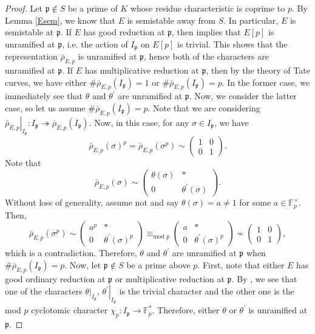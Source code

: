 \documentclass[]{article}
\begin{document}
\begin{proof}
 Let $\mathfrak{p}\notin S$ be a prime of $K$ whose residue characteristic is coprime to $p$. By Lemma \ref{Esem}, we know that $E$ is semistable away from $S$. In particular, $E$ is semistable at $\mathfrak{p}$. If $E$ has good reduction at  $\mathfrak{p}$, then \cite[Theorem VII.7.1]{silverman2009arithmetic} implies that $E[p]$ is unramified at $\mathfrak{p}$, i.e. the action of $I_{\mathfrak{p}}$ on $E[p]$ is trivial. This shows that the representation $\bar{\rho}_{E, p}$ is unramified at $\mathfrak{p}$, hence both of the characters are unramified at $\mathfrak{p}$. If $E$ has multiplicative reduction at $\mathfrak{p}$, then by the theory of Tate curves, we have either $\# \bar{\rho}_{E, p}(I_{\mathfrak{p}})=1$ or $\# \bar{\rho}_{E, p}(I_{\mathfrak{p}})=p$. In the former case, we immediately see that $\theta$ and $\theta^{\prime}$ are unramified at $\mathfrak{p}$. Now, we consider the latter case, so let us assume $\# \bar{\rho}_{E, p}(I_{\mathfrak{p}})=p$. Note that we are considering $\left.\bar{\rho}_{E, p}\right|_{I_{\mathfrak{p}}}: I_{\mathfrak{p}}\twoheadrightarrow \bar{\rho}_{E, p}(I_{\mathfrak{p}})$. Now, in this case, for any $\sigma\in I_{\mathfrak{p}}$, we have $$\bar{\rho}_{E, p}(\sigma)^p=\bar{\rho}_{E, p}(\sigma^p)\sim \left(\begin{array}{ll}
1 & 0 \\
0 & 1
\end{array}\right).$$Note that $$\bar{\rho}_{E, p}(\sigma)\sim \left(\begin{array}{ll}
\theta(\sigma) & * \\
0 & \theta^{\prime}(\sigma)
\end{array}\right).$$Without loss of generality, assume not and say $\theta(\sigma)=a\ne 1$ for some $a\in \mathbb{F}_p^{\times}$. Then,
$$\bar{\rho}_{E, p}(\sigma^p)\sim \left(\begin{array}{ll}
a^p & * \\
0 & \theta^{\prime}(\sigma)^p
\end{array}\right)\equiv_{\text{mod $p$}}\left(\begin{array}{ll}
a & * \\
0 & \theta^{\prime}(\sigma)^p
\end{array}\right)\not\sim \left(\begin{array}{ll}
1 & 0 \\
0 & 1
\end{array}\right),$$which is a contradiction. Therefore, $\theta$ and $\theta^{\prime}$ are unramified at $\mathfrak{p}$ when $\# \bar{\rho}_{E, p}(I_{\mathfrak{p}})=p$. Now, let $\mathfrak{p}\notin S$ be a prime above $p$. First, note that either $E$ has good ordinary reduction at $\mathfrak{p}$ or multiplicative reduction at $\mathfrak{p}$. By \cite[Corollary p.274 \& Corollary p.276]{serre1972proprietes}, we see that one of the characters $\left.\theta\right|_{I_{\mathfrak{p}}}$, $\left.\theta^{\prime}\right|_{I_{\mathfrak{p}}}$ is the trivial character and the other one is the mod $p$ cyclotomic character $\chi_p: I_{\mathfrak{p}}\to \mathbb{F}_p^*$. Therefore, either $\theta$ or $\theta^{\prime}$ is unramified at  $\mathfrak{p}$. 
\end{proof}
\end{document}
